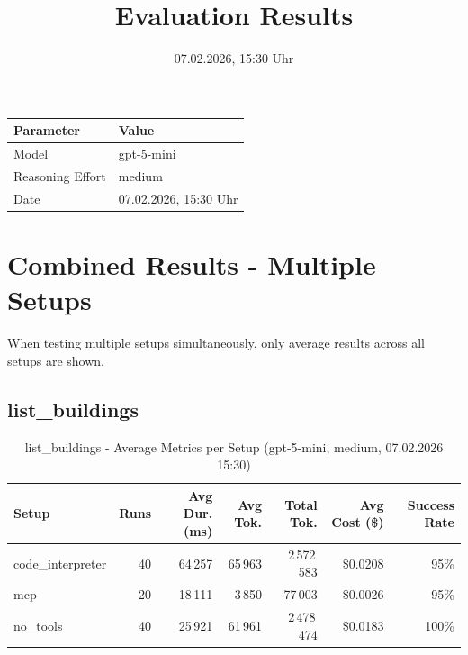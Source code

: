 \documentclass[a4paper,11pt]{article}
\title{Evaluation Results}
\date{07.02.2026, 15:30 Uhr}
\begin{document}
\maketitle

\begin{table}[H]
\centering
\begin{tabular}{l l}
\toprule
\textbf{Parameter} & \textbf{Value} \\
\midrule
Model & gpt-5-mini \\
Reasoning Effort & medium \\
Date & 07.02.2026, 15:30 Uhr \\
\bottomrule
\end{tabular}
\end{table}

\tableofcontents
\clearpage

\section{Combined Results - Multiple Setups}

When testing multiple setups simultaneously, only average results across all setups are shown.

\subsection{list\_buildings}

\begin{table}[H]
\centering
\scriptsize
\caption{list\_buildings - Average Metrics per Setup (gpt-5-mini, medium, 07.02.2026 15:30)}
\label{tab:combined\_list\_buildings\_metrics\_20260207}
\begin{tabular}{l r r r r r r}
\toprule
Setup & Runs & Avg Dur. (ms) & Avg Tok. & Total Tok. & Avg Cost (\$) & Success Rate \\
\midrule
code\_interpreter & 40 & 64\,257 & 65\,963 & 2\,572\,583 & \$0.0208 & 95\% \\
mcp & 20 & 18\,111 & 3\,850 & 77\,003 & \$0.0026 & 95\% \\
no\_tools & 40 & 25\,921 & 61\,961 & 2\,478\,474 & \$0.0183 & 100\% \\
\bottomrule
\end{tabular}
\end{table}
\end{document}
